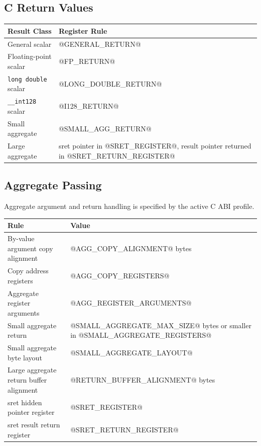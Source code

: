 \subsection{C Return Values}
\begingroup\footnotesize
\setlength{\tabcolsep}{2pt}
\begin{longtable}{@{}p{2.15in}p{3.35in}@{}}
\toprule
\textbf{Result Class} & \textbf{Register Rule}\\
\midrule
\endhead
General scalar & @GENERAL_RETURN@\\
Floating-point scalar & @FP_RETURN@\\
\texttt{long double} scalar & @LONG_DOUBLE_RETURN@\\
\texttt{\_\_int128} scalar & @I128_RETURN@\\
Small aggregate & @SMALL_AGG_RETURN@\\
Large aggregate & sret pointer in @SRET_REGISTER@, result pointer returned in @SRET_RETURN_REGISTER@\\
\bottomrule
\end{longtable}
\endgroup

\subsection{Aggregate Passing}
Aggregate argument and return handling is specified by the active C ABI profile.

\begingroup\footnotesize
\setlength{\tabcolsep}{2pt}
\begin{longtable}{@{}p{2.2in}p{3.3in}@{}}
\toprule
\textbf{Rule} & \textbf{Value}\\
\midrule
\endhead
By-value argument copy alignment & @AGG_COPY_ALIGNMENT@ bytes\\
Copy address registers & @AGG_COPY_REGISTERS@\\
Aggregate register arguments & @AGG_REGISTER_ARGUMENTS@\\
Small aggregate return & @SMALL_AGGREGATE_MAX_SIZE@ bytes or smaller in @SMALL_AGGREGATE_REGISTERS@\\
Small aggregate byte layout & @SMALL_AGGREGATE_LAYOUT@\\
Large aggregate return buffer alignment & @RETURN_BUFFER_ALIGNMENT@ bytes\\
sret hidden pointer register & @SRET_REGISTER@\\
sret result return register & @SRET_RETURN_REGISTER@\\
\bottomrule
\end{longtable}
\endgroup

